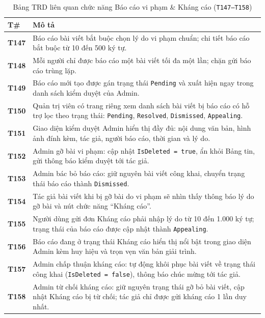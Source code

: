 \documentclass[11pt,a4paper]{article}
\begin{document}
\begin{table}[H]
\centering
\small
\begin{tabularx}{\textwidth}{|C{1.5cm}|X|}
\hline
{}
\textbf{T\#} & \textbf{Mô tả} \tabularnewline
\hline
\textbf{T147} & Báo cáo bài viết bắt buộc chọn lý do vi phạm chuẩn; chi tiết báo cáo bắt buộc từ 10 đến 500 ký tự. \\ \hline
\textbf{T148} & Mỗi người chỉ được báo cáo một bài viết tối đa một lần; chặn gửi báo cáo trùng lặp. \\ \hline
\textbf{T149} & Báo cáo mới tạo được gán trạng thái \texttt{Pending} và xuất hiện ngay trong danh sách kiểm duyệt của Admin. \\ \hline
\textbf{T150} & Quản trị viên có trang riêng xem danh sách bài viết bị báo cáo có hỗ trợ lọc theo trạng thái: \texttt{Pending}, \texttt{Resolved}, \texttt{Dismissed}, \texttt{Appealing}. \\ \hline
\textbf{T151} & Giao diện kiểm duyệt Admin hiển thị đầy đủ: nội dung văn bản, hình ảnh đính kèm, tác giả, người báo cáo, thời gian và lý do. \\ \hline
\textbf{T152} & Admin gỡ bài vi phạm: cập nhật \texttt{IsDeleted = true}, ẩn khỏi Bảng tin, gửi thông báo kiểm duyệt tới tác giả. \\ \hline
\textbf{T153} & Admin bác bỏ báo cáo: giữ nguyên bài viết công khai, chuyển trạng thái báo cáo thành \texttt{Dismissed}. \\ \hline
\textbf{T154} & Tác giả bài viết khi bị gỡ bài do vi phạm sẽ nhìn thấy thông báo lý do gỡ bài và nút chức năng ``Kháng cáo''. \\ \hline
\textbf{T155} & Người dùng gửi đơn Kháng cáo phải nhập lý do từ 10 đến 1.000 ký tự; trạng thái của báo cáo được cập nhật thành \texttt{Appealing}. \\ \hline
\textbf{T156} & Báo cáo đang ở trạng thái Kháng cáo hiển thị nổi bật trong giao diện Admin kèm huy hiệu và trọn vẹn văn bản giải trình. \\ \hline
\textbf{T157} & Admin chấp thuận kháng cáo: tự động khôi phục bài viết về trạng thái công khai (\texttt{IsDeleted = false}), thông báo chúc mừng tới tác giả. \\ \hline
\textbf{T158} & Admin từ chối kháng cáo: giữ nguyên trạng thái gỡ bỏ bài viết, cập nhật Kháng cáo bị từ chối; tác giả chỉ được gửi kháng cáo 1 lần duy nhất. \\ \hline
\end{tabularx}
\caption{Bảng TRD liên quan chức năng Báo cáo vi phạm \& Kháng cáo (\texttt{T147--T158})}
\end{table}
\end{document}
